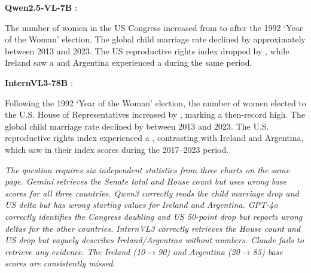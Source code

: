 \documentclass{article} %
\begin{document}
\noindent\textbf{Qwen2.5-VL-7B} :
\begin{tcolorbox}[enhanced,breakable,colback=red!5,colframe=red!30,boxrule=0.4pt,arc=2pt,left=6pt,right=6pt,top=2pt,bottom=2pt]
\footnotesize
The number of women in the US Congress increased from  to  after the
1992 `Year of the Woman' election. The global child marriage rate declined by
approximately  between 2013 and 2023.
The US reproductive rights index dropped by , while Ireland saw a
 and Argentina experienced a 
during the same period.
\end{tcolorbox}

\noindent\textbf{InternVL3-78B} :
\begin{tcolorbox}[enhanced,breakable,colback=red!5,colframe=red!30,boxrule=0.4pt,arc=2pt,left=6pt,right=6pt,top=2pt,bottom=2pt]
\footnotesize
Following the 1992 `Year of the Woman' election, the number of women elected to
the U.S. House of Representatives increased by , marking a then-record high.
The global child marriage rate declined by  between 2013
and 2023. The U.S. reproductive rights index experienced a ,
contrasting with Ireland and Argentina, which saw 
in their index scores during the 2017--2023 period.
\end{tcolorbox}

\noindent\textit{The question requires six independent statistics from three charts on the same page. Gemini retrieves the Senate total and House count but uses wrong base scores for all three countries. Qwen3 correctly reads the child marriage drop and US delta but has wrong starting values for Ireland and Argentina. GPT-4o correctly identifies the Congress doubling and US 50-point drop but reports wrong deltas for the other countries. InternVL3 correctly retrieves the House count and US drop but vaguely describes Ireland/Argentina without numbers. Claude fails to retrieve any evidence. The Ireland (10$\to$90) and Argentina (20$\to$85) base scores are consistently missed.}
\end{document}
